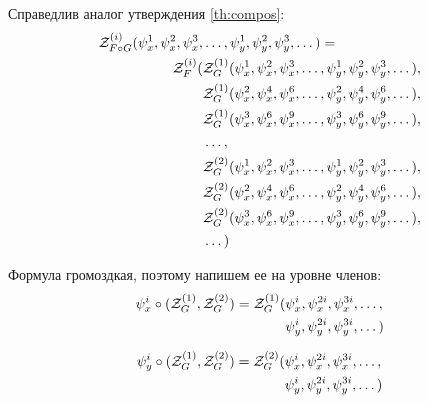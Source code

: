 \begin{theorem}
\label{th:z-main}
Справедлив аналог утверждения \ref{th:compos}:
\begin{equation}
\begin{split}
\label{eq:h-zfg}
	\mathcal Z^{(i)}_{F \circ G} (\psi_x^1, \psi_x^2, \psi_x^3, &\dots, 
	\psi_y^1, \psi_y^2, \psi_y^3, \dots) = \\
	\mathcal Z_F^{(i)}(
		&\mathcal Z^{(1)}_G(\psi_x^1, \psi_x^2, \psi_x^3, \dots, 
					 \psi_y^1, \psi_y^2, \psi_y^3, \dots), \\
		&\mathcal Z^{(1)}_G(\psi_x^2, \psi_x^4, \psi_x^6, \dots, 
					 \psi_y^2, \psi_y^4, \psi_y^6, \dots), \\
		&\mathcal Z^{(1)}_G(\psi_x^3, \psi_x^6, \psi_x^9, \dots, 
					 \psi_y^3, \psi_y^6, \psi_y^9, \dots), \\
		&\dots, \\
		&\mathcal Z^{(2)}_G(\psi_x^1, \psi_x^2, \psi_x^3, \dots, 
					 \psi_y^1, \psi_y^2, \psi_y^3, \dots), \\
		&\mathcal Z^{(2)}_G(\psi_x^2, \psi_x^4, \psi_x^6, \dots, 
					 \psi_y^2, \psi_y^4, \psi_y^6, \dots), \\
		&\mathcal Z^{(2)}_G(\psi_x^3, \psi_x^6, \psi_x^9, \dots, 
					 \psi_y^3, \psi_y^6, \psi_y^9, \dots), \\
		&\dots
	)
\end{split}	
\end{equation}
\end{theorem}
Формула громоздкая, поэтому напишем ее на уровне членов:
\begin{equation}
\label{eq:psi-x}
\begin{split}
\psi_x^i \circ (\mathcal Z^{(1)}_G, \mathcal Z^{(2)}_G ) = \mathcal Z^{(1)}_G
(&\psi_x^i, \psi_x^{2i}, \psi_x^{3i}, \dots, \\
&\psi_y^i, \psi_y^{2i}, \psi_y^{3i}, \dots)
\end{split}
\end{equation}

\begin{equation}
\label{eq:psi-y}
\begin{split}
\psi_y^i \circ (\mathcal Z^{(1)}_G, \mathcal Z^{(2)}_G ) = \mathcal Z^{(2)}_G
(&\psi_x^i, \psi_x^{2i}, \psi_x^{3i}, \dots, \\
&\psi_y^i, \psi_y^{2i}, \psi_y^{3i}, \dots)
\end{split}
\end{equation}

